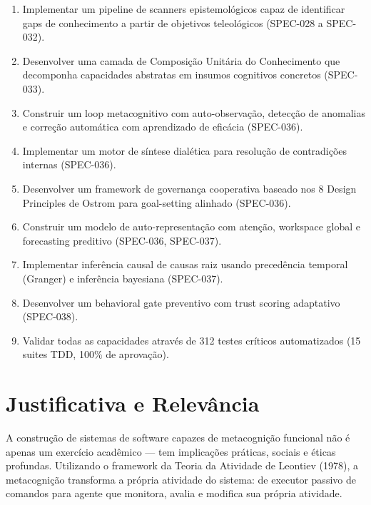 \begin{enumerate}
    \item Implementar um pipeline de scanners epistemológicos capaz de identificar gaps de conhecimento a partir de objetivos teleológicos (SPEC-028 a SPEC-032).
    \item Desenvolver uma camada de Composição Unitária do Conhecimento que decomponha capacidades abstratas em insumos cognitivos concretos (SPEC-033).
    \item Construir um loop metacognitivo com auto-observação, detecção de anomalias e correção automática com aprendizado de eficácia (SPEC-036).
    \item Implementar um motor de síntese dialética para resolução de contradições internas (SPEC-036).
    \item Desenvolver um framework de governança cooperativa baseado nos 8 Design Principles de Ostrom para goal-setting alinhado (SPEC-036).
    \item Construir um modelo de auto-representação com atenção, workspace global e forecasting preditivo (SPEC-036, SPEC-037).
    \item Implementar inferência causal de causas raiz usando precedência temporal (Granger) e inferência bayesiana (SPEC-037).
    \item Desenvolver um behavioral gate preventivo com trust scoring adaptativo (SPEC-038).
    \item Validar todas as capacidades através de 312 testes críticos automatizados (15 suites TDD, 100\% de aprovação).
\end{enumerate}

\section{Justificativa e Relevância}

A construção de sistemas de software capazes de metacognição funcional não é apenas um exercício acadêmico — tem implicações práticas, sociais e éticas profundas. Utilizando o framework da Teoria da Atividade de Leontiev (1978), a metacognição transforma a própria atividade do sistema: de executor passivo de comandos para agente que monitora, avalia e modifica sua própria atividade.

